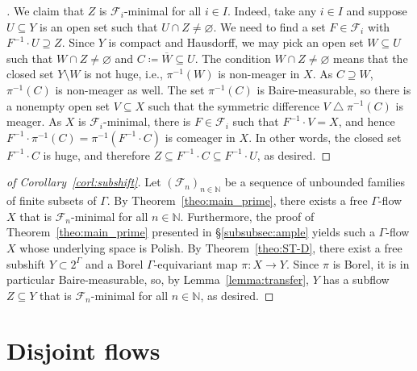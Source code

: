 \documentclass[11pt,reqno,psamsfonts]{amsart}
\theoremstyle{bfnote}
\theoremstyle{definition}
\theoremstyle{remark}
\newcommand{\0}{\varnothing}
\newcommand{\set}[1]{\{#1\}}
\newcommand{\defeq}{\coloneqq}
\newcommand{\emphd}[1]{{\fontseries{b}\selectfont\textsf{#1}}}
\newcommand{\G}{\Gamma}
\newcommand{\symdif}{\mathbin{\triangle}}
\newcommand{\N}{\mathbb{N}}
\newcommand{\Ret}{\mathsf{Ret}}
\numberwithin{equation}{section}
\newenvironment{scproof}[1][]{\begin{proof}[\textsc{\upshape{Proof}}#1]}{\end{proof}}
\begin{document}
\begin{scproof}
        We claim that $Z$ is $\mathcal{F}_i$-minimal for all $i \in I$. Indeed, take any $i \in I$ and suppose $U \subseteq Y$ is an open set such that $U \cap Z \neq \0$. We need to find a set $F \in \mathcal{F}_i$ with $F^{-1} \cdot U \supseteq Z$. %
        Since $Y$ is compact and Hausdorff, we may pick an open set $W \subseteq U$ such that $W \cap Z \neq \0$ and $C \defeq \overline{W} \subseteq U$. 
        The condition $W \cap Z \neq \0$ means that
        the closed set $Y \setminus W$ is not huge, i.e., $\pi^{-1}(W)$ is non-meager in $X$. As $C \supseteq W$, $\pi^{-1}(C)$ is non-meager as well. %
        The set $\pi^{-1}(C)$ is Baire-measurable, so there is a nonempty open set $V \subseteq X$ such that the symmetric difference $V \symdif \pi^{-1}(C)$ is meager.  As $X$ is $\mathcal{F}_i$-minimal, there is $F \in \mathcal{F}_i$ such that $F^{-1}\cdot V = X$, and hence $F^{-1} \cdot \pi^{-1}(C) = \pi^{-1}(F^{-1} \cdot C)$ is comeager in $X$. In other words, the closed set $F^{-1} \cdot C$ is huge, and therefore $Z \subseteq F^{-1} \cdot C \subseteq F^{-1} \cdot U$, as desired.
    \end{scproof}

    \begin{scproof}[ of Corollary~\ref{corl:subshift}]
        Let $(\mathcal{F}_n)_{n \in \N}$ be a sequence of unbounded families of finite subsets of $\G$. By Theorem~\ref{theo:main_prime}, there exists a free $\G$-flow $X$ that is $\mathcal{F}_n$-minimal for all $n \in \N$. Furthermore, the proof of Theorem~\ref{theo:main_prime} presented in \S\ref{subsubsec:ample} yields such a $\G$-flow $X$ whose underlying space is Polish. By Theorem~\ref{theo:ST-D}, there exist a free subshift $Y \subset 2^\G$ and a Borel $\G$-equivariant map $\pi \colon X \to Y$. Since $\pi$ is Borel, it is in particular Baire-measurable, so, by Lemma~\ref{lemma:transfer}, $Y$ has a subflow $Z \subseteq Y$
        that is $\mathcal{F}_n$-minimal for all $n \in \N$, as desired.
    \end{scproof}

    \section{Disjoint flows}\label{sec:disjoint}

\end{document}
